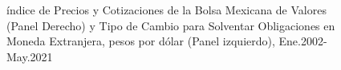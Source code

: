 \documentclass[
  a4paper,
]{article}
\begin{document}
\begin{figure}

\caption{\label{fig-fig3}índice de Precios y Cotizaciones de la Bolsa
Mexicana de Valores (Panel Derecho) y Tipo de Cambio para Solventar
Obligaciones en Moneda Extranjera, pesos por dólar (Panel izquierdo),
Ene.2002-May.2021}\begin{minipage}[t]{0.50\linewidth}

{\centering 


}

\end{minipage}%
%
\begin{minipage}[t]{0.50\linewidth}

{\centering 


}

\end{minipage}%

\end{figure}
\end{document}
